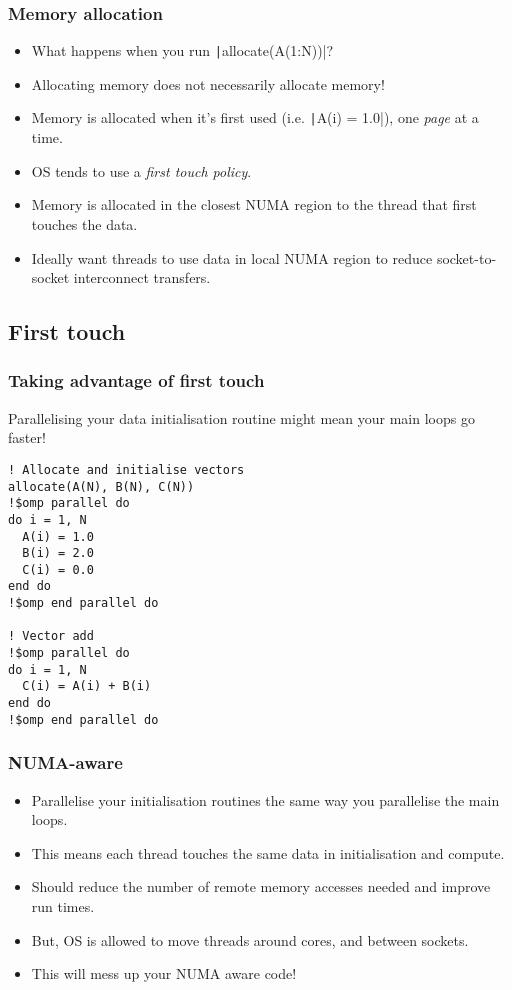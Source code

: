 \documentclass[aspectratio=169]{beamer}
\begin{document}
\begin{frame}
\frametitle{Memory allocation}
\begin{itemize}
  \item What happens when you run \texttt|allocate(A(1:N))|?
  \pause
  \item Allocating memory does not necessarily allocate memory!
  \item Memory is allocated when it's first used (i.e. \texttt|A(i) = 1.0|), one \emph{page} at a time.
  \item OS tends to use a \emph{first touch policy}.
  \item Memory is allocated in the closest NUMA region to the thread that first touches the data.
  \item Ideally want threads to use data in local NUMA region to reduce socket-to-socket interconnect transfers.
\end{itemize}
\end{frame}

\subsection{First touch}
\begin{frame}[fragile]
\frametitle{Taking advantage of first touch}
Parallelising your data initialisation routine might mean your main loops go faster!


\begin{verbatim}
! Allocate and initialise vectors
allocate(A(N), B(N), C(N))
!$omp parallel do
do i = 1, N
  A(i) = 1.0
  B(i) = 2.0
  C(i) = 0.0
end do
!$omp end parallel do

! Vector add
!$omp parallel do
do i = 1, N
  C(i) = A(i) + B(i)
end do
!$omp end parallel do
\end{verbatim}

\end{frame}

\begin{frame}
\frametitle{NUMA-aware}
\begin{itemize}
  \item Parallelise your initialisation routines the same way you parallelise the main loops.
  \item This means each thread touches the same data in initialisation and compute.
  \item Should reduce the number of remote memory accesses needed and improve run times.
  \item But, OS is allowed to move threads around cores, and between sockets.
  \item This will mess up your NUMA aware code!
\end{itemize}
\end{frame}
\end{document}
